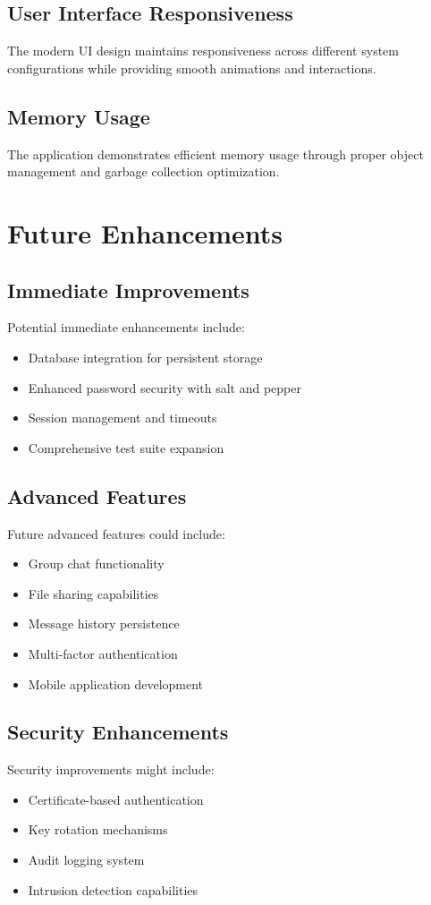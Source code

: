 \documentclass[12pt,a4paper]{article}
\begin{document}
\subsection{User Interface Responsiveness}
The modern UI design maintains responsiveness across different system configurations while providing smooth animations and interactions.

\subsection{Memory Usage}
The application demonstrates efficient memory usage through proper object management and garbage collection optimization.

\section{Future Enhancements}

\subsection{Immediate Improvements}
Potential immediate enhancements include:
\begin{itemize}
    \item Database integration for persistent storage
    \item Enhanced password security with salt and pepper
    \item Session management and timeouts
    \item Comprehensive test suite expansion
\end{itemize}

\subsection{Advanced Features}
Future advanced features could include:
\begin{itemize}
    \item Group chat functionality
    \item File sharing capabilities
    \item Message history persistence
    \item Multi-factor authentication
    \item Mobile application development
\end{itemize}

\subsection{Security Enhancements}
Security improvements might include:
\begin{itemize}
    \item Certificate-based authentication
    \item Key rotation mechanisms
    \item Audit logging system
    \item Intrusion detection capabilities
\end{itemize}
\end{document}
